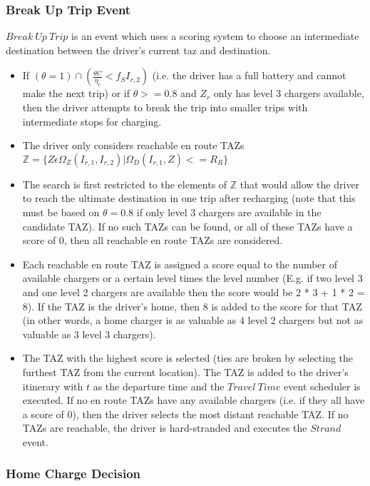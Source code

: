 \documentclass[journal]{IEEEtran}
\begin{document}
\subsubsection{Break Up Trip Event}\label{breakEv}

$Break ~Up ~Trip$ is an event which uses a scoring system to choose an intermediate destination between the driver's current taz and destination.
\begin{itemize}
  \item	If $(\theta = 1) \cap \left(\frac{\theta C}{\eta_e} < f_S I_{r,2} \right)$ (i.e. the driver has a full battery and cannot make the next trip) or if $\theta >= 0.8$ and $Z_r$ only has level 3 chargers available, then the driver attempts to break the trip into smaller trips with intermediate stops for charging.
  \item	The driver only considers reachable en route TAZs $\mathbb{Z} = \{Z \epsilon \Omega_Z(I_{r,1},I_{r,2}) | \Omega_D(I_{r,1},Z) <= R_R\}$ 
  \item	The search is first restricted to the elements of $\mathbb{Z}$ that would allow the driver to reach the ultimate destination in one trip after recharging (note that this must be based on $\theta = 0.8$ if only level 3 chargers are available in the candidate TAZ).  If no such TAZs can be found, or all of these TAZs have a score of 0, then all reachable en route TAZs are considered.
  \item	Each reachable en route TAZ is assigned a score equal to the number of available chargers or a certain level times the level number (E.g. if two level 3 and one level 2 chargers are available then the score would be 2 * 3 + 1 * 2 = 8).  If the TAZ is the driver's home, then 8 is added to the score for that TAZ (in other words, a home charger is as valuable as 4 level 2 chargers but not as valuable as 3 level 3 chargers).  
  \item	The TAZ with the highest score is selected (ties are broken by selecting the furthest TAZ from the current location).  The TAZ is added to the driver's itinerary with $t$ as the departure time and the $Travel ~Time$ event scheduler is executed.  If no en route TAZs have any available chargers (i.e. if they all have a score of 0), then the driver selects the most distant reachable TAZ.  If no TAZs are reachable, the driver is hard-stranded and executes the $Strand$ event.
\end{itemize}

\subsubsection{Home Charge Decision}\label{homeDec}
\end{document}

